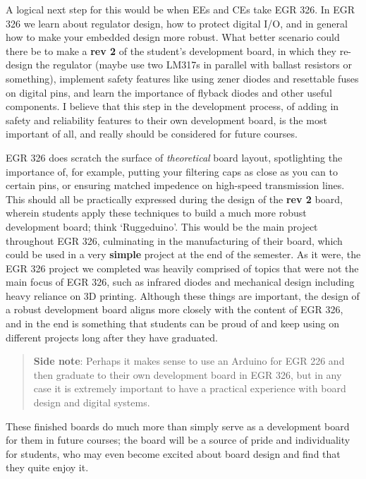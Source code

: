 \documentclass[12pt]{article}
\numberwithin{figure}{section}
\numberwithin{equation}{section}
\begin{document}
{\bigskip

A logical next step for this would be when EEs and CEs take EGR 326. In
EGR 326 we learn about regulator design, how to protect digital I/O, and
in general how to make your embedded design more robust. What better
scenario could there be to make a \textbf{rev 2} of the student's
development board, in which they re-design the regulator (maybe use two
LM317s in parallel with ballast resistors or something), implement
safety features like using zener diodes and resettable fuses on digital
pins, and learn the importance of flyback diodes and other useful
components. I believe that this step in the development process, of adding in safety and reliability features to their own development board, is the most important of all, and really should be considered for future courses.

\bigskip

EGR 326 does scratch the surface of \emph{theoretical} board layout,
spotlighting the importance of, for example, putting your filtering caps
as close as you can to certain pins, or ensuring matched
impedence on high-speed transmission lines. This should all be
practically expressed during the design of the \textbf{rev 2} board,
wherein students apply these techniques to build a much more robust
development board; think `Ruggeduino'. This would be the main project
throughout EGR 326, culminating in the manufacturing of their board,
which could be used in a very \textbf{simple} project at the end of the
semester. As it were, the EGR 326 project we completed was heavily
comprised of topics that were not the main focus of EGR 326, such as
infrared diodes and mechanical design including heavy reliance on
3D printing. Although these things are important, the design of a robust
development board aligns more closely with the content of EGR 326, and
in the end is something that students can be proud of and keep using on
different projects long after they have graduated.

\begin{quote}
\textbf{Side note}: Perhaps it makes sense to use an Arduino for EGR 226
and then graduate to their own development board in EGR 326, but in any
case it is extremely important to have a practical experience with board
design and digital systems.
\end{quote}

These finished boards do much more than simply serve as a development
board for them in future courses; the board will be a source of pride
and individuality for students, who may even become excited about board
design and find that they quite enjoy it.

}
\end{document}
